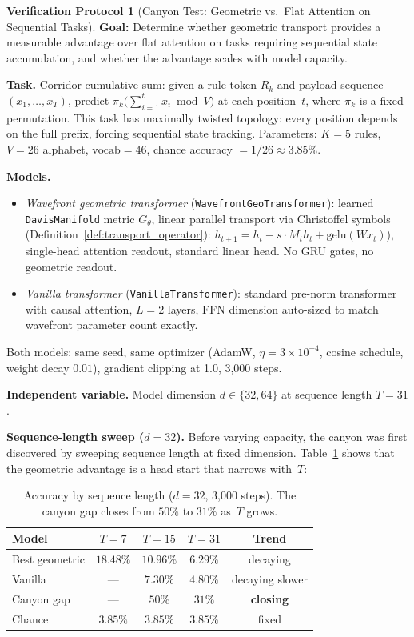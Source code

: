 \documentclass[11pt,a4paper]{article}
\theoremstyle{definition}
\newtheorem{protocol}[theorem]{Verification Protocol}
\theoremstyle{remark}
\begin{document}
\begin{protocol}[Canyon Test: Geometric vs.\ Flat Attention on 
Sequential Tasks]\label{prot:canyon}
\textbf{Goal:} Determine whether geometric transport provides a 
measurable advantage over flat attention on tasks requiring 
sequential state accumulation, and whether the advantage scales 
with model capacity.

\textbf{Task.} Corridor cumulative-sum: given a rule token $R_k$ 
and payload sequence $(x_1, \ldots, x_T)$, predict 
$\pi_k\!\bigl(\sum_{i=1}^{t} x_i \bmod V\bigr)$ at each 
position~$t$, where $\pi_k$ is a fixed permutation. This task 
has maximally twisted topology: every position depends on the 
full prefix, forcing sequential state tracking. Parameters: 
$K = 5$ rules, $V = 26$ alphabet, $\mathrm{vocab} = 46$, 
chance accuracy $= 1/26 \approx 3.85\%$.

\textbf{Models.}
\begin{itemize}[nosep]
  \item \emph{Wavefront geometric transformer} 
  (\texttt{WavefrontGeoTransformer}): learned 
  \texttt{DavisManifold} metric $G_\theta$, linear parallel 
  transport via Christoffel symbols 
  (Definition~\ref{def:transport_operator}):
  $h_{t+1} = h_t - s \cdot M_t h_t + \mathrm{gelu}(W x_t)$), 
  single-head attention readout, standard linear head. No GRU 
  gates, no geometric readout.
  \item \emph{Vanilla transformer} 
  (\texttt{VanillaTransformer}): standard pre-norm transformer 
  with causal attention, $L = 2$ layers, FFN dimension 
  auto-sized to match wavefront parameter count exactly.
\end{itemize}
Both models: same seed, same optimizer (AdamW, $\eta = 3 \times 
10^{-4}$, cosine schedule, weight decay $0.01$), gradient 
clipping at 1.0, 3{,}000 steps.

\textbf{Independent variable.} Model dimension 
$d \in \{32, 64\}$ at sequence length $T = 31$.

\textbf{Sequence-length sweep ($d = 32$).} Before varying 
capacity, the canyon was first discovered by sweeping sequence 
length at fixed dimension. Table~\ref{tab:sl_sweep} shows that 
the geometric advantage is a head start that narrows with~$T$:

\begin{table}[h]
\centering
\caption{Accuracy by sequence length ($d = 32$, 3{,}000 steps).  
The canyon gap closes from $50\%$ to $31\%$ as~$T$ grows.}
\label{tab:sl_sweep}
\begin{tabular}{lcccc}
\toprule
Model & $T = 7$ & $T = 15$ & $T = 31$ & Trend \\
\midrule
Best geometric & $18.48\%$ & $10.96\%$ & $6.29\%$ & decaying \\
Vanilla        & ---       & $7.30\%$  & $4.80\%$ & decaying slower \\
Canyon gap     & ---       & $50\%$    & $31\%$   & \textbf{closing} \\
Chance         & $3.85\%$  & $3.85\%$  & $3.85\%$ & fixed \\
\bottomrule
\end{tabular}
\end{table}


\end{protocol}
\end{document}

